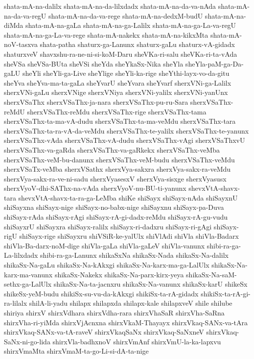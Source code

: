 {shata-mA-na-dalilx
shata-mA-na-da-lilxdadx
shata-mA-na-da-va-nAda
shata-mA-na-da-va-regU
shata-mA-na-da-va-rege
shata-mA-na-dedxM-budU
shata-mA-na-diMda
shata-mA-na-gaLa
shata-mA-na-ga-Lalilx
shata-mA-na-ga-La-va-regU
shata-mA-na-ga-La-va-rege
shata-mA-nakekx
shata-mA-na-kikxMta
shata-mA-noV-tasxva
shata-patha
shaturx-ga-Lanunx
shaturx-gaLu
shaturx-vA-gidadx
shaturxveV
shavxshu-ra-ne-ni-si-koM-Daru
sheVKa-ri-salu
sheVKa-ri-ta-vAda
sheVSa
sheVSa-BUta
sheVSi
sheYda
sheYkaSx-Nika
sheYla
sheYla-paM-ga-Da-gaLU
sheYli
sheYli-ga-Live
sheYlige
sheYli-ka-rige
sheYthi-layx-vo-da-gitu
sheYva
sheYva-ma-ta-gaLa
sheYvarU
sheYvara
sheYvarf
sherxVNi-ga-Lalilx
sherxVNi-gaLu
sherxVNige
sherxVNiya
sherxVNi-yalilx
sherxVNi-yanUnx
sherxVSaThx
sherxVSaThx-ja-nara
sherxVSaThx-pu-ru-Sara
sherxVSaThx-reMdU
sherxVSaThx-reMdu
sherxVSaThx-rige
sherxVSaThx-tama
sherxVSaThx-ta-ma-vA-dudu
sherxVSaThx-ta-ma-veMdu
sherxVSaThx-tara
sherxVSaThx-ta-ra-vA-da-veMdu
sherxVSaThx-te-yalilx
sherxVSaThx-te-yanunx
sherxVSaThx-vAda
sherxVSaThx-vA-dudu
sherxVSaThx-vAgi
sherxVSaThxvU
sherxVSaThx-va-gaRda
sherxVSaThx-va-gaRkekx
sherxVSaThx-veMba
sherxVSaThx-veM-bu-danunx
sherxVSaThx-veM-budu
sherxVSaThx-veMdu
sherxVSaTx-veMba
sherxVSathx
sherxVya-sakxra
sherxVya-sakx-ra-veMdu
sherxVya-sakx-ra-ve-ni-sadu
sherxVyasesxV
sherxVya-sisxge
sherxVyasusx
sherxVyoV-dhi-SAThx-na-vAda
sherxVyoV-nu-BU-ti-yanunx
shevxVtA-shavx-tara
shevxVtA-shavx-ta-ra-ga-LeMba
shiKe
shiSayx
shiSayx-nAda
shiSayxnU
shiSayxna
shiSayx-nige
shiSayx-no-babx-nige
shiSayxnu
shiSayx-pa-Duva
shiSayx-rAda
shiSayx-rAgi
shiSayx-rA-gi-dadx-reMdu
shiSayx-rA-gu-vudu
shiSayxrU
shiSayxra
shiSayx-ralilx
shiSayx-ri-dadxru
shiSayx-ri-gAgi
shiSayx-rigU
shiSayx-rige
shiSayxru
shiVSiR-ke-yalUlx
shiVlAdi
shiVla
shiVla-Badarx
shiVla-Ba-darx-noM-dige
shiVla-gaLa
shiVla-gaLeV
shiVla-vanunx
shibi-ra-ga-La-lilxdadx
shibi-ra-ga-Lanunx
shikaSxNa
shikaSx-Nada
shikaSx-Na-dalilx
shikaSx-Na-gaLu
shikaSx-Na-kAkxgi
shikaSx-Na-karx-ma-ga-LalUlx
shikaSx-Na-karx-ma-vanunx
shikaSx-Nakekx
shikaSx-Na-parx-kirx-yeya
shikaSx-Na-saM-sethx-ga-LalUlx
shikaSx-Na-ta-jacnxru
shikaSx-Na-vanunx
shikaSx-karU
shikeSx
shikeSx-yeM-budu
shikiSx-su-vu-da-kAkxgi
shikiSx-ta-rA-gidadx
shikiSx-ta-rA-gi-ra-lilalx
shilA-li-yadu
shilapx
shilapxda
shilapx-kale
shilapxveV
shile
shilube
shiriya
shirxV
shirxVdhara
shirxVdha-rara
shirxVhaSaR
shirxVha-SaRna
shirxVha-ri-yiMda
shirxVjAcnxna
shirxVkaM-Thayayx
shirxVkaq-SANx-va-tAra
shirxVkaq-SANx-va-tA-raveV
shirxVkaqSaNx
shirxVkaq-SaNxneV
shirxVkaq-SaNx-ni-go-lida
shirxVla-badhxnoV
shirxVmAnf
shirxVmU-la-ka-lapxvu
shirxVmaMta
shirxVmaM-ta-go-Li-si-dA-ta-nige
}
